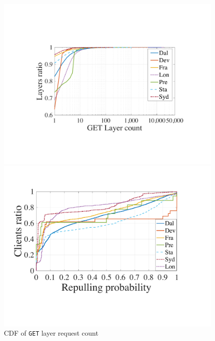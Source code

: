 
\begin{figure}[t]
        \centering
        \begin{minipage}{0.3\textwidth}
                \centering
                \includegraphics[width=\textwidth]{graphs/cdf-layer-repull-ratio-by-same-client.pdf}
                \caption{CDF of \texttt{GET} layer request count}
                \label{fig:layer-repull-cdf}
        \end{minipage}%
\hspace{1mm}
        \begin{minipage}{0.265\textwidth}
                \centering
                \includegraphics[width=\textwidth]{graphs/cdf-client-repull-layer-request-ratio.pdf}

\end{minipage}
\end{figure}
